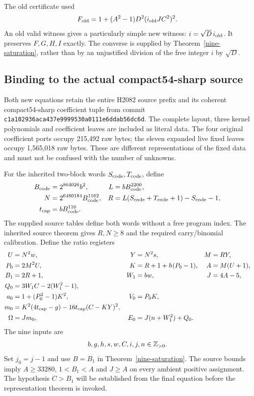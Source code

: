 The old certificate used
\[
 F_{\rm old}=1+(A^2-1)D^2(i_{\rm old}JC^2)^2.
\]
An old valid witness gives a particularly simple new witness:
$i=\sqrt D\,i_{\rm old}$.  It preserves $F,G,H,I$ exactly.  The converse
is supplied by Theorem~\ref{nine-saturation}, rather than by an unjustified
division of the free integer $i$ by $\sqrt D$.

\subsection{Binding to the actual compact54-sharp source}

Both new equations retain the entire H2082 source prefix and its coherent
compact54-sharp coefficient tuple from commit
\texttt{c1a102936aca437e9999530a0111e6ddab56dc6d}.
The complete layout, three kernel polynomials and coefficient leaves are
included as literal data.  The four original coefficient ports occupy
215,492 raw bytes; the eleven expanded live fixed leaves occupy 1,565,018
raw bytes.  These are different representations of the fixed data and
must not be confused with the number of unknowns.

For the inherited two-block words $S_{\rm code},T_{\rm code}$, define
\begin{align*}
 B_{\rm code}&=2^{864026}b^2,&
 L&=bB_{\rm code}^{2200},\\
 N&=2^{6480184}B_{\rm code}^{1162},&
 R&=L(S_{\rm code}+T_{\rm code}+1)-S_{\rm code}-1,\\
 t_{\rm cap}&=bB_{\rm code}^{116}.&&
\end{align*}
The supplied source tables define both words without a free program index.
The inherited source theorem gives $R,N\ge8$ and the required
carry/binomial calibration.  Define the ratio registers
\begin{align*}
 U&=N^2w,&Y&=N^2s,&M&=RY,\\
 P_0&=2M^2U,&K&=R+1+h(P_0-1),&A&=M(U+1),\\
 B_1&=2R+1,&W_1&=bw,&J&=4A-5,\\
 Q_0&=3W_1C-2(W_1^2-1),&&&\\
 a_0&=1+(P_0^2-1)K^2,&V_0&=P_0K,&&\\
 m_0&=K^2(4t_{\rm cap}-g)-16t_{\rm cap}(C-KY)^2,&&&\\
 \Omega&=Jm_0,&E_0&=J(n+W_1^2)+Q_0.&&
\end{align*}
The nine inputs are
\[
 b,g,h,s,w,C,i,j,n\in\mathbb Z_{>0}.
\]
Set $j_0=j-1$ and use $B=B_1$ in Theorem~\ref{nine-saturation}.
The source bounds imply $A\ge33280$, $1<B_1<A$ and $J\ge A$ on every
ambient positive assignment.  The hypothesis $C>B_1$ will be established
from the final equation before the representation theorem is invoked.

